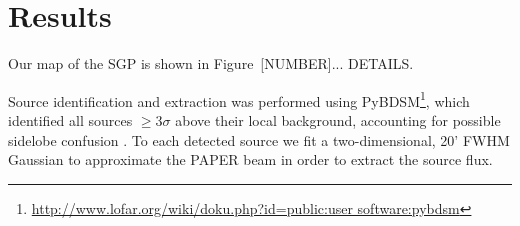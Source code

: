 \documentclass[useAMS,usenatbib]{mn2e}
\begin{document}




\section{Results}
\label{sec:res}

Our map of the SGP is shown in Figure~{\color{red}[NUMBER]... DETAILS}.

Source identification and extraction was performed using PyBDSM\footnote{\url{http://www.lofar.org/wiki/doku.php?id=public:user software:pybdsm}}, which identified all sources $\geq3\sigma$ above their local background, accounting for possible sidelobe confusion \citep{PyBDSM.15}. To each detected source we fit a two-dimensional, 20' FWHM Gaussian to approximate the PAPER beam \citep{Parsons.10} in order to extract the source flux. 
\end{document}

